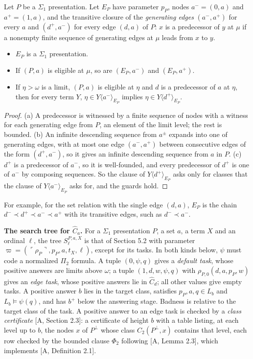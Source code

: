 \documentclass[11pt]{article}
\begin{document}
\begin{statement} Let $P$ be a $\Sigma_1$ presentation. Let $E_P$ have parameter $p_P$,
nodes $a^- = (0,a)$ and $a^+ = (1,a)$, and the transitive closure of the \emph{generating edges} $(a^-, a^+)$ for every
$a$ and $(d^+, a^-)$ for every edge $(d,a)$ of $P$: $x$ is a predecessor of $y$ at $\mu$ if a nonempty finite sequence
of generating edges at $\mu$ leads from $x$ to $y$.
\begin{itemize}
\item[(a)] $E_P$ is a $\Sigma_1$ presentation.
\item[(b)] If $(P,a)$ is eligible at $\mu$, so are $(E_P,a^-)$ and $(E_P,a^+)$.
\item[(c)] If $\eta > \omega$ is a limit, $(P,a)$ is eligible at $\eta$ and $d$ is a predecessor of $a$ at $\eta$, then
  for every term $Y$, $\eta \in Y\langle a^-\rangle_{E_P}$ implies $\eta \in Y\langle d^+\rangle_{E_P}$.
\end{itemize}
\end{statement}

\begin{proof}
(a) A predecessor is witnessed by a finite sequence of nodes with a witness for each generating edge from $P$, an
element of the limit level; the rest is bounded. (b) An infinite descending sequence from $a^\pm$ expands into one of
generating edges, with at most one edge $(a^-,a^+)$ between consecutive edges of the form $(d^+, a^-)$, so it gives an
infinite descending sequence from $a$ in $P$. (c) $d^+$ is a predecessor of $a^-$, so it is well-founded, and every
predecessor of $d^+$ is one of $a^-$ by composing sequences. So the clause of $Y\langle d^+\rangle_{E_P}$ asks only
for classes that the clause of $Y\langle a^-\rangle_{E_P}$ asks for, and the guards hold.
\end{proof}

For example, for the set relation with the single edge $(d,a)$, $E_P$ is the chain $d^- \prec d^+ \prec a^- \prec a^+$
with its transitive edges, such as $d^- \prec a^-$.

\textbf{The search tree for $\widehat C_a$.} For a $\Sigma_1$ presentation $P$, a set $a$, a term $X$ and an ordinal
$\ell$, the tree $S^{P,a,X}_\ell$ is that of Section 5.2 with parameter $\varpi = (\ulcorner\rho_P\urcorner, p_P, a, t_X,
\ell)$, except for its tasks. In both kinds below, $\psi$ must code a normalized $\Pi_2$ formula. A tuple
$(0,\psi,q)$ gives a \emph{default task}, whose positive answers are limits above $\omega$; a tuple $(1,d,w,\psi,q)$
with $\rho_{P,0}(d,a,p_P,w)$ gives an \emph{edge task}, whose positive answers lie in $\widehat C_d$; all other values
give empty tasks. A positive answer $b$ lies in the target class, satisfies $p_P, a, q \in L_b$ and $L_b \models
\psi(q)$, and has $b^+$ below the answering stage. Badness is relative to the target class of the task. A positive
answer to an edge task is checked by a \emph{class certificate} [A, Section 2.3]: a certificate of height $b$ with a
table listing, at each level up to $b$, the nodes $x$ of $P^\bot$ whose class $C_2(P^\bot,x)$ contains that level,
each row checked by the bounded clause $\Phi_2$ following [A, Lemma 2.3], which implements [A, Definition 2.1].
\end{document}
